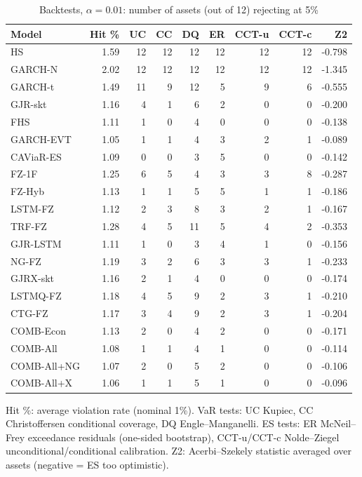 \begin{table}[htbp]
\centering
\footnotesize
\caption{Backtests, $\alpha=0.01$: number of assets (out of 12) rejecting at 5\%}
\label{tab:bt_a010}
\begin{tabular}{lrrrrrrrr}
\toprule
Model & Hit \% & UC & CC & DQ & ER & CCT-u & CCT-c & Z2 \\
\midrule
HS & 1.59 & 12 & 12 & 12 & 12 & 12 & 12 & -0.798 \\
GARCH-N & 2.02 & 12 & 12 & 12 & 12 & 12 & 12 & -1.345 \\
GARCH-t & 1.49 & 11 & 9 & 12 & 5 & 9 & 6 & -0.555 \\
GJR-skt & 1.16 & 4 & 1 & 6 & 2 & 0 & 0 & -0.200 \\
FHS & 1.11 & 1 & 0 & 4 & 0 & 0 & 0 & -0.138 \\
GARCH-EVT & 1.05 & 1 & 1 & 4 & 3 & 2 & 1 & -0.089 \\
CAViaR-ES & 1.09 & 0 & 0 & 3 & 5 & 0 & 0 & -0.142 \\
FZ-1F & 1.25 & 6 & 5 & 4 & 3 & 3 & 8 & -0.287 \\
FZ-Hyb & 1.13 & 1 & 1 & 5 & 5 & 1 & 1 & -0.186 \\
LSTM-FZ & 1.12 & 2 & 3 & 8 & 3 & 2 & 1 & -0.167 \\
TRF-FZ & 1.28 & 4 & 5 & 11 & 5 & 4 & 2 & -0.353 \\
GJR-LSTM & 1.11 & 1 & 0 & 3 & 4 & 1 & 0 & -0.156 \\
NG-FZ & 1.19 & 3 & 2 & 6 & 3 & 3 & 1 & -0.233 \\
GJRX-skt & 1.16 & 2 & 1 & 4 & 0 & 0 & 0 & -0.174 \\
LSTMQ-FZ & 1.18 & 4 & 5 & 9 & 2 & 3 & 1 & -0.210 \\
CTG-FZ & 1.17 & 3 & 4 & 9 & 2 & 3 & 1 & -0.204 \\
COMB-Econ & 1.13 & 2 & 0 & 4 & 2 & 0 & 0 & -0.171 \\
COMB-All & 1.08 & 1 & 1 & 4 & 1 & 0 & 0 & -0.114 \\
COMB-All+NG & 1.07 & 2 & 0 & 5 & 2 & 0 & 0 & -0.106 \\
COMB-All+X & 1.06 & 1 & 1 & 5 & 1 & 0 & 0 & -0.096 \\
\bottomrule
\end{tabular}
\par\smallskip\parbox{\linewidth}{\scriptsize Hit \%: average violation rate (nominal 1\%). VaR tests: UC Kupiec, CC Christoffersen conditional coverage, DQ Engle--Manganelli. ES tests: ER McNeil--Frey exceedance residuals (one-sided bootstrap), CCT-u/CCT-c Nolde--Ziegel unconditional/conditional calibration. Z2: Acerbi--Szekely statistic averaged over assets (negative = ES too optimistic).}
\end{table}